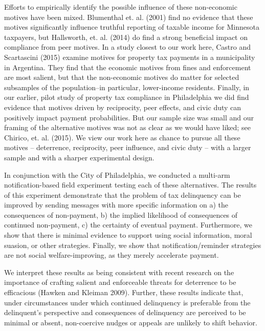 \documentclass[12pt,titlepage]{article}
\begin{document}
Efforts to empirically identify the possible influence of these non-economic 
motives have been mixed.   Blumenthal et. al. (2001) find no evidence that 
these motives significantly influence truthful reporting of taxable income 
for Minnesota taxpayers, but Hallsworth, et. al. (2014) do find a strong 
beneficial impact on compliance from peer motives.  In a study closest to 
our work here, Castro and Scartascini (2015) examine motives for property 
tax payments in a municipality in Argentina.  They find that the economic 
motives from fines and enforcement are most salient, but that the non-economic 
motives do matter for selected subsamples of the population--in particular, 
lower-income residents.   Finally, in our earlier, pilot study of property tax 
compliance in Philadelphia we did find evidence that motives driven by 
reciprocity, peer effects, and civic duty can positively impact payment 
probabilities. But our sample size was small and our framing of the 
alternative motives was not as clear as we would have liked; see 
Chirico, et. al. (2015).  We view our work here as chance to pursue all 
these motives – deterrence, reciprocity, peer influence, and civic duty – 
with a larger sample and with a sharper experimental design.     

In conjunction with the City of Philadelphia, we conducted a multi-arm 
notification-based field experiment testing each of these alternatives. The 
results of this experiment demonstrate that the problem of tax delinquency 
can be improved by sending messages with more specific information on
a) the consequences of non-payment, b) the implied likelihood of 
consequences of continued non-payment, c) the certainty of eventual 
payment. Furthermore, we show that there is minimal evidence to support 
using social information, moral suasion, or other strategies. Finally, 
we show that notification/reminder strategies are not social 
welfare-improving, as they merely accelerate payment. 


We interpret these results as being consistent with recent research 
on the importance of crafting salient and enforceable threats for 
deterrence to be efficacious (Hawken and Kleiman 2009). Further, these results indicate
that, under circumstances under which continued delinquency is preferable 
from the delinquent’s perspective and consequences of delinquency are 
perceived to be minimal or absent, non-coercive nudges or appeals are 
unlikely to shift behavior. 
\end{document}
